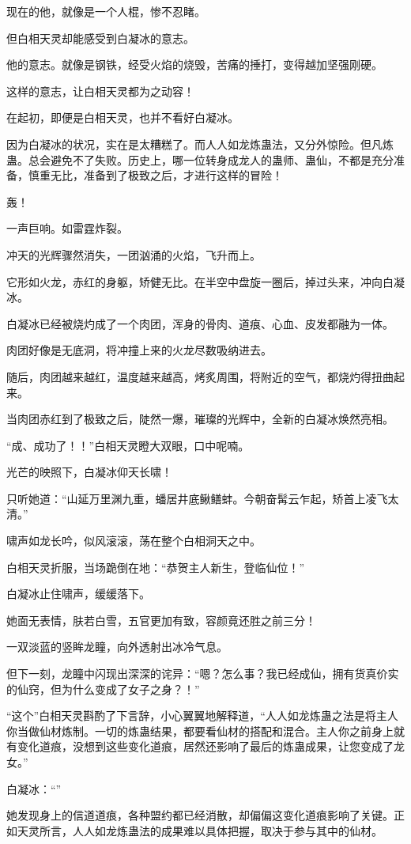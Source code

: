 \begin{this_body}
现在的他，就像是一个人棍，惨不忍睹。

但白相天灵却能感受到白凝冰的意志。

他的意志。就像是钢铁，经受火焰的烧毁，苦痛的捶打，变得越加坚强刚硬。

这样的意志，让白相天灵都为之动容！

在起初，即便是白相天灵，也并不看好白凝冰。

因为白凝冰的状况，实在是太糟糕了。而人人如龙炼蛊法，又分外惊险。但凡炼蛊。总会避免不了失败。历史上，哪一位转身成龙人的蛊师、蛊仙，不都是充分准备，慎重无比，准备到了极致之后，才进行这样的冒险！

轰！

一声巨响。如雷霆炸裂。

冲天的光辉骤然消失，一团汹涌的火焰，飞升而上。

它形如火龙，赤红的身躯，矫健无比。在半空中盘旋一圈后，掉过头来，冲向白凝冰。

白凝冰已经被烧灼成了一个肉团，浑身的骨肉、道痕、心血、皮发都融为一体。

肉团好像是无底洞，将冲撞上来的火龙尽数吸纳进去。

随后，肉团越来越红，温度越来越高，烤炙周围，将附近的空气，都烧灼得扭曲起来。

当肉团赤红到了极致之后，陡然一爆，璀璨的光辉中，全新的白凝冰焕然亮相。

“成、成功了！！”白相天灵瞪大双眼，口中呢喃。

光芒的映照下，白凝冰仰天长啸！

只听她道：“山延万里渊九重，蟠居井底鳅鳝蚌。今朝奋髯云乍起，矫首上凌飞太清。”

啸声如龙长吟，似风滚滚，荡在整个白相洞天之中。

白相天灵折服，当场跪倒在地：“恭贺主人新生，登临仙位！”

白凝冰止住啸声，缓缓落下。

她面无表情，肤若白雪，五官更加有致，容颜竟还胜之前三分！

一双淡蓝的竖眸龙瞳，向外透射出冰冷气息。

但下一刻，龙瞳中闪现出深深的诧异：“嗯？怎么事？我已经成仙，拥有货真价实的仙窍，但为什么变成了女子之身？！”

“这个”白相天灵斟酌了下言辞，小心翼翼地解释道，“人人如龙炼蛊之法是将主人你当做仙材炼制。一切的炼蛊结果，都要看仙材的搭配和混合。主人你之前身上就有变化道痕，没想到这些变化道痕，居然还影响了最后的炼蛊成果，让您变成了龙女。”

白凝冰：“”

她发现身上的信道道痕，各种盟约都已经消散，却偏偏这变化道痕影响了关键。正如天灵所言，人人如龙炼蛊法的成果难以具体把握，取决于参与其中的仙材。


\end{this_body}
